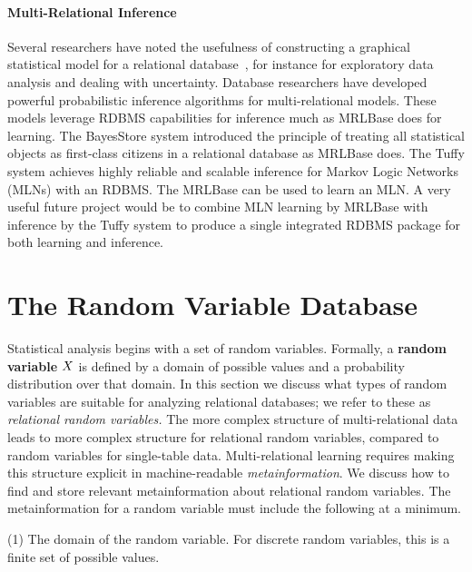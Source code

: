 \documentclass{acm_proc_article-sp}
\begin{document}
\paragraph{Multi-Relational Inference} Several researchers have noted the usefulness of constructing a graphical statistical model for a relational database~\cite{Deshpande2007,Graepel_CIKM13,Wang2008}, for instance for exploratory data analysis and dealing with uncertainty. Database researchers have developed powerful probabilistic inference  algorithms for multi-relational models. These models leverage RDBMS capabilities for inference much as MRLBase does for learning. The BayesStore system \cite{Wang2008} introduced the principle of treating all statistical objects as first-class citizens in a relational database as MRLBase does. The Tuffy system \cite{DBLP:journals/pvldb/NiuRDS11} achieves highly reliable and scalable inference for Markov Logic Networks (MLNs) with an RDBMS. The MRLBase can be used to learn an MLN. A very useful future project would be to combine MLN learning by MRLBase with inference by the Tuffy system to produce a single integrated RDBMS package for both learning and inference. 



\section{The Random Variable Database} 


Statistical analysis begins with a set of random variables. Formally, a \textbf{random variable} $X$ is defined by a domain of possible values and a probability distribution over that domain. In this section we discuss what types of random variables are suitable for analyzing relational databases; we refer to these as {\em relational random variables.} The more complex structure of multi-relational data leads to more complex structure for relational random variables, compared to random variables for single-table data.  
Multi-relational learning requires making this structure explicit in machine-readable {\em metainformation}. We discuss how to find and store relevant metainformation about relational random variables. The metainformation for a random variable must include the following at a minimum.

(1) The domain of the random variable. For discrete random variables, this is a finite set of possible values.
\end{document}
